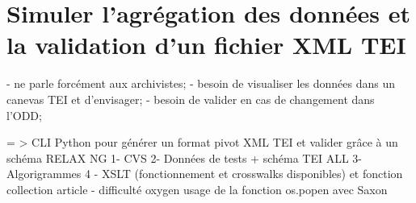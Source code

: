 \section{Simuler l'agrégation des données et la validation d'un fichier XML TEI}
- ne parle forcément aux archivistes;
- besoin de visualiser les données dans un canevas TEI et d'envisager;
- besoin de valider en cas de changement dans l'ODD; 

= > CLI Python pour générer un format pivot XML TEI et valider grâce à un schéma RELAX NG
1- CVS
2- Données de tests + schéma TEI ALL
3- Algorigrammes 
4 - XSLT (fonctionnement et crosswalks disponibles) et fonction collection article - difficulté oxygen usage de la fonction os.popen avec Saxon 

